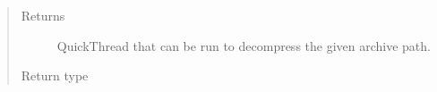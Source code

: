 \documentclass[letterpaper,10pt,english]{sphinxmanual}
\begin{document}
\begin{fulllineitems}
\begin{fulllineitems}
\begin{quote}
\begin{description}
\item[{Returns}] \leavevmode
QuickThread that can be run to de\sphinxhyphen{}compress the given archive path.

\item[{Return type}] \leavevmode
{\hyperref[\detokenize{polo.threads:polo.threads.thread.QuickThread}]{}}

\end{description}\end{quote}

\end{fulllineitems}


\end{fulllineitems}

\end{document}
